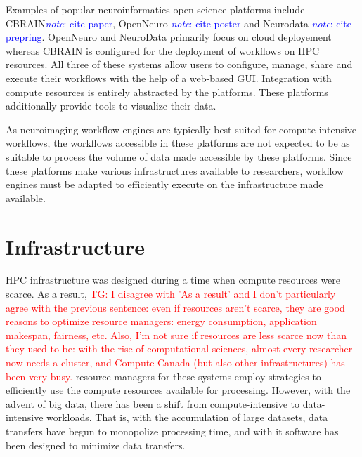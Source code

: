 \documentclass{report}
\newcommand{\note}[1]{\textcolor{blue}{\textit{note}: #1}}
\newcommand{\tristan}[1]{\textcolor{red}{TG: #1}}
\begin{document}
            Examples of popular neuroinformatics open-science platforms include 
            CBRAIN\note{cite paper}, OpenNeuro \note{cite poster} and Neurodata
            \note{cite prepring}. OpenNeuro and NeuroData primarily focus on
            cloud deployement whereas CBRAIN is configured for the deployment
            of workflows on HPC resources. All three of these systems allow 
            users to configure, manage, share and execute their workflows with 
            the help of a web-based GUI. Integration with compute resources is
            entirely abstracted by the platforms. These platforms additionally
            provide tools to visualize their data.

            As neuroimaging workflow engines are typically best suited for 
            compute-intensive workflows, the workflows accessible in these 
            platforms are not expected to be as suitable to process the 
            volume of data made accessible by these platforms. Since these 
            platforms make various infrastructures available to researchers, 
            workflow engines must be adapted to efficiently execute on the 
            infrastructure made available.
            
        \section{Infrastructure}\label{infrastructure}
            HPC infrastructure was designed during a time when compute resources
            were scarce. As a result, \tristan{I disagree with 'As a result' and I don't particularly agree with the previous sentence: even if
            resources aren't scarce, they are good reasons to optimize resource managers: energy consumption, application makespan, fairness, etc. Also,
            I'm not sure if resources are less scarce now than they used to be: with the rise of computational sciences, almost every researcher now
            needs a cluster, and Compute Canada (but also other infrastructures) has been very busy.}
            resource managers for these systems employ
            strategies to efficiently use the compute resources available for 
            processing. However, with the advent of big data, there has been a 
            shift from compute-intensive to data-intensive workloads. That is, 
            with the accumulation of large datasets, data transfers have begun 
            to monopolize processing time, and with it software has been 
            designed to minimize data transfers.
\end{document}
